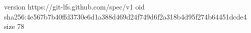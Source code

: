 version https://git-lfs.github.com/spec/v1
oid sha256:4e567b7b40ffd3730e6d1a388d469d24f749d6f2a318b4d95f274b64451dcde4
size 78
